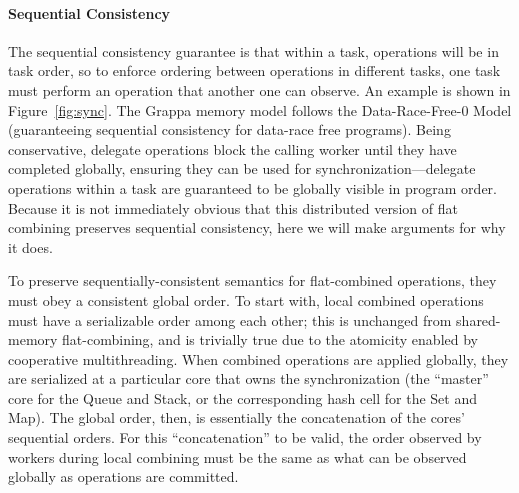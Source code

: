 
\paragraph{Sequential Consistency}
The sequential consistency guarantee is that within a task, operations will be in task order, so to enforce ordering between operations in different tasks, one task must perform an operation that another one can observe. An example is shown in Figure~\ref{fig:sync}.
The Grappa memory model follows the Data-Race-Free-0 Model (guaranteeing sequential consistency for data-race free programs). Being conservative, delegate operations block the calling worker until they have completed globally, ensuring they can be used for synchronization---delegate operations within a task are guaranteed to be globally visible in program order.
Because it is not immediately obvious that this distributed version of flat combining preserves sequential consistency, here we will make arguments for why it does.

To preserve sequentially-consistent semantics for flat-combined operations, they must obey a consistent global order.
To start with, local combined operations must have a serializable order among each other; this is unchanged from shared-memory flat-combining, and is trivially true due to the atomicity enabled by cooperative multithreading.
When combined operations are applied globally, they are serialized at a particular core that owns the synchronization (the ``master'' core for the Queue and Stack, or the corresponding hash cell for the Set and Map). The global order, then, is essentially the concatenation of the cores' sequential orders.
For this ``concatenation'' to be valid, the order observed by workers during local combining must be the same as what can be observed globally as operations are committed.

